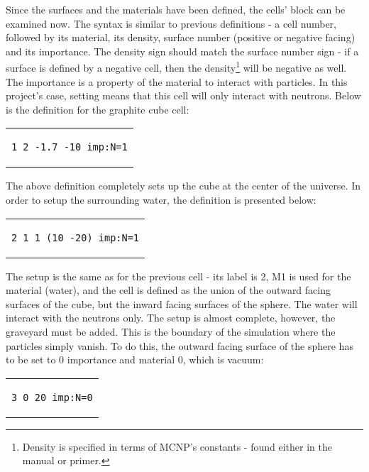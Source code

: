 Since the surfaces and the materials have been defined, the cells' block can be examined now. The syntax is similar to previous definitions - a cell number, followed by its material, its density, surface number (positive or negative facing) and its importance. The density sign should match the surface number sign - if a surface is defined by a negative cell, then the density\footnote{Density is specified in terms of MCNP's constants - found either in the manual or primer.} will be negative as well. The importance is a property of the material to interact with particles. In this project's case, setting  means that this cell will only interact with neutrons. Below is the definition for the graphite cube cell:

\begin{center}
\begin{tabular}{c}
\begin{lstlisting}
1 2 -1.7 -10 imp:N=1
\end{lstlisting}
\end{tabular}
\end{center}

The above definition completely sets up the cube at the center of the universe. In order to setup the surrounding water, the definition is presented below:

\begin{center}
\begin{tabular}{c}
\begin{lstlisting}
2 1 1 (10 -20) imp:N=1
\end{lstlisting}
\end{tabular}
\end{center}

The setup is the same as for the previous cell - its label is 2, M1 is used for the material (water), and the cell is defined as the union of the outward facing surfaces of the cube, but the inward facing surfaces of the sphere. The water will interact with the neutrons only. The setup is almost complete, however, the graveyard must be added. This is the boundary of the simulation where the particles simply vanish. To do this, the outward facing surface of the sphere has to be set to 0 importance and material 0, which is vacuum:

\begin{center}
\begin{tabular}{c}
\begin{lstlisting}
3 0 20 imp:N=0
\end{lstlisting}
\end{tabular}
\end{center}

